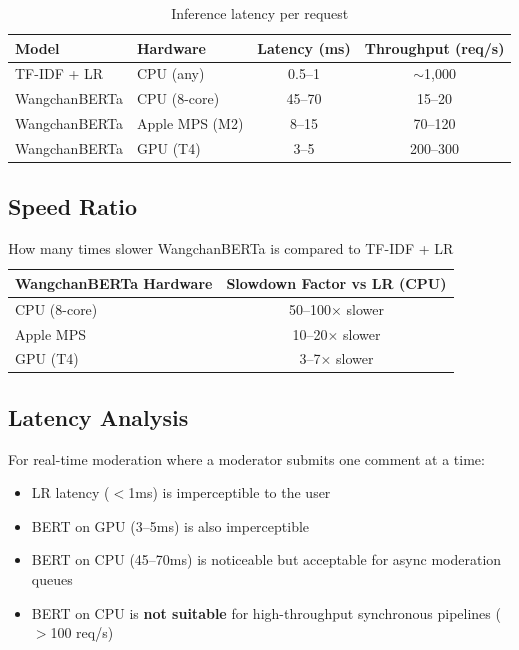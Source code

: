 \documentclass[11pt,a4paper]{article}
\begin{document}
\begin{table}[H]
\centering
\caption{Inference latency per request}
\label{tab:latency}
\begin{tabular}{@{}llcc@{}}
\toprule
\textbf{Model} & \textbf{Hardware} & \textbf{Latency (ms)} & \textbf{Throughput (req/s)} \\
\midrule
TF-IDF + LR & CPU (any)        & 0.5--1    & $\sim$1,000 \\
\midrule
WangchanBERTa & CPU (8-core)   & 45--70    & 15--20 \\
WangchanBERTa & Apple MPS (M2) & 8--15     & 70--120 \\
WangchanBERTa & GPU (T4)       & 3--5      & 200--300 \\
\bottomrule
\end{tabular}
\end{table}

\subsection{Speed Ratio}

\begin{table}[H]
\centering
\caption{How many times slower WangchanBERTa is compared to TF-IDF + LR}
\label{tab:speed-ratio}
\begin{tabular}{@{}lc@{}}
\toprule
\textbf{WangchanBERTa Hardware} & \textbf{Slowdown Factor vs LR (CPU)} \\
\midrule
CPU (8-core) & 50--100$\times$ slower \\
Apple MPS    & 10--20$\times$ slower \\
GPU (T4)     & 3--7$\times$ slower \\
\bottomrule
\end{tabular}
\end{table}

\subsection{Latency Analysis}

For real-time moderation where a moderator submits one comment at a time:
\begin{itemize}[nosep]
    \item LR latency ($<$1ms) is imperceptible to the user
    \item BERT on GPU (3--5ms) is also imperceptible
    \item BERT on CPU (45--70ms) is noticeable but acceptable for async moderation queues
    \item BERT on CPU is \textbf{not suitable} for high-throughput synchronous pipelines ($>$100 req/s)
\end{itemize}
\end{document}
